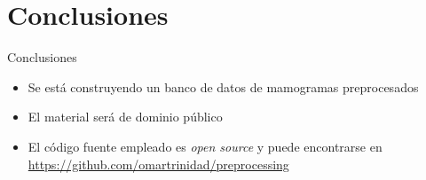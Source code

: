 \documentclass{beamer}
\begin{document}
\section{Conclusiones}
\begin{frame}{Conclusiones}
\transdissolve
  \pause
  \begin{itemize}[<+-| alert@+ >]
    \item Se está construyendo un banco de datos de mamogramas preprocesados
    \item El material será de dominio público
    \item El código fuente empleado es \textit{open source} y puede encontrarse en {\small \url{https://github.com/omartrinidad/preprocessing}}
  \end{itemize}
\end{frame}
\end{document}
